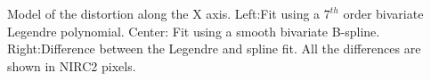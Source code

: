 Model of the distortion along the X axis.  Left:Fit using a $7^{th}$ order bivariate Legendre polynomial.  Center: Fit using a smooth bivariate B-spline. Right:Difference between the Legendre and spline fit.  All the differences are shown in NIRC2 pixels.  \label{dist_x}